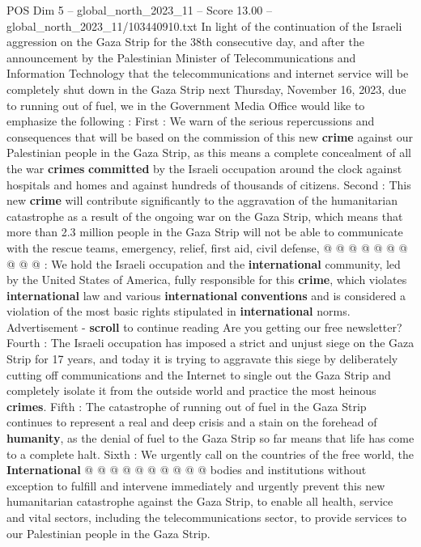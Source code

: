 \begin{textsample}{POS Dim 5 – global\_north\_2023\_11 – Score 13.00 – global\_north\_2023\_11/103440910.txt}  \label{ex:f5_pos_417}
In light of the continuation of the Israeli aggression on the Gaza Strip for the 38th consecutive day, and after the announcement by the Palestinian Minister of Telecommunications and Information Technology that the telecommunications and internet service will be completely shut down in the Gaza Strip next Thursday, November 16, 2023, due to running out of fuel, we in the Government Media Office would like to emphasize the following : First : We warn of the serious repercussions and consequences that will be based on the commission of this new \textbf{crime} against our Palestinian people in the Gaza Strip, as this means a complete concealment of all the war \textbf{crimes} \textbf{committed} by the Israeli occupation around the clock against hospitals and homes and against hundreds of thousands of citizens.
Second : This new \textbf{crime} will contribute significantly to the aggravation of the humanitarian catastrophe as a result of the ongoing war on the Gaza Strip, which means that more than 2.3 million people in the Gaza Strip will not be able to communicate with the rescue teams, emergency, relief, first aid, civil defense, @ @ @ @ @ @ @ @ @ @ : We hold the Israeli occupation and the \textbf{international} community, led by the United States of America, fully responsible for this \textbf{crime}, which violates \textbf{international} law and various \textbf{international} \textbf{conventions} and is considered a violation of the most basic rights stipulated in \textbf{international} norms.
Advertisement - \textbf{scroll} to continue reading Are you getting our free newsletter?
Fourth : The Israeli occupation has imposed a strict and unjust siege on the Gaza Strip for 17 years, and today it is trying to aggravate this siege by deliberately cutting off communications and the Internet to single out the Gaza Strip and completely isolate it from the outside world and practice the most heinous \textbf{crimes}.
Fifth : The catastrophe of running out of fuel in the Gaza Strip continues to represent a real and deep crisis and a stain on the forehead of \textbf{humanity}, as the denial of fuel to the Gaza Strip so far means that life has come to a complete halt.
Sixth : We urgently call on the countries of the free world, the \textbf{International} @ @ @ @ @ @ @ @ @ @ bodies and institutions without exception to fulfill and intervene immediately and urgently prevent this new humanitarian catastrophe against the Gaza Strip, to enable all health, service and vital sectors, including the telecommunications sector, to provide services to our Palestinian people in the Gaza Strip.

\end{textsample}
